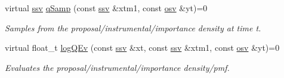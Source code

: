 \begin{DoxyCompactItemize}
virtual \hyperlink{classSISRFilter_abfec45cf57ea6fadae4a9da8b0042351}{ssv} \hyperlink{classSISRFilter_a609bb361da16e1b24ebfab693620241b}{q\+Samp} (const \hyperlink{classSISRFilter_abfec45cf57ea6fadae4a9da8b0042351}{ssv} \&xtm1, const \hyperlink{classSISRFilter_a5b762e9352857a9e48db3932191887ef}{osv} \&yt)=0
\begin{DoxyCompactList}\small\item\em Samples from the proposal/instrumental/importance density at time t. \end{DoxyCompactList}\item 
virtual float\+\_\+t \hyperlink{classSISRFilter_a4edca9291a3a118c37bd0e41c06fb7da}{log\+Q\+Ev} (const \hyperlink{classSISRFilter_abfec45cf57ea6fadae4a9da8b0042351}{ssv} \&xt, const \hyperlink{classSISRFilter_abfec45cf57ea6fadae4a9da8b0042351}{ssv} \&xtm1, const \hyperlink{classSISRFilter_a5b762e9352857a9e48db3932191887ef}{osv} \&yt)=0
\begin{DoxyCompactList}\small\item\em Evaluates the proposal/instrumental/importance density/pmf. \end{DoxyCompactList}\end{DoxyCompactItemize}

